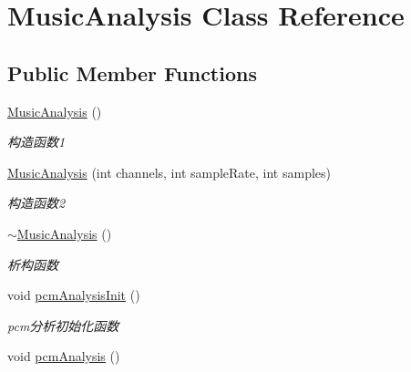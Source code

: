 \hypertarget{classMusicAnalysis}{\section{\-Music\-Analysis \-Class \-Reference}
\label{classMusicAnalysis}
}
\subsection*{\-Public \-Member \-Functions}
\begin{DoxyCompactItemize}
\item 
\hypertarget{classMusicAnalysis_afd466b6be98a4919713dbfb488d2940b}{\hyperlink{classMusicAnalysis_afd466b6be98a4919713dbfb488d2940b}{\-Music\-Analysis} ()}\label{classMusicAnalysis_afd466b6be98a4919713dbfb488d2940b}

\begin{DoxyCompactList}\small\item\em 构造函数1 \end{DoxyCompactList}\item 
\hyperlink{classMusicAnalysis_a2696773487959b7581b3478789478ab5}{\-Music\-Analysis} (int channels, int sample\-Rate, int samples)
\begin{DoxyCompactList}\small\item\em 构造函数2 \end{DoxyCompactList}\item 
\hypertarget{classMusicAnalysis_a3df9fb4f94de5cc2b7177d9330ec1e90}{\hyperlink{classMusicAnalysis_a3df9fb4f94de5cc2b7177d9330ec1e90}{$\sim$\-Music\-Analysis} ()}\label{classMusicAnalysis_a3df9fb4f94de5cc2b7177d9330ec1e90}

\begin{DoxyCompactList}\small\item\em 析构函数 \end{DoxyCompactList}\item 
\hypertarget{classMusicAnalysis_a799a99f2f26b9795b37a8bb3b4df4db4}{void \hyperlink{classMusicAnalysis_a799a99f2f26b9795b37a8bb3b4df4db4}{pcm\-Analysis\-Init} ()}\label{classMusicAnalysis_a799a99f2f26b9795b37a8bb3b4df4db4}

\begin{DoxyCompactList}\small\item\em pcm分析初始化函数 \end{DoxyCompactList}\item 
\hypertarget{classMusicAnalysis_a25a81fa655054b85f0a45744c27e28d5}{void \hyperlink{classMusicAnalysis_a25a81fa655054b85f0a45744c27e28d5}{pcm\-Analysis} ()}\label{classMusicAnalysis_a25a81fa655054b85f0a45744c27e28d5}


\end{DoxyCompactItemize}
